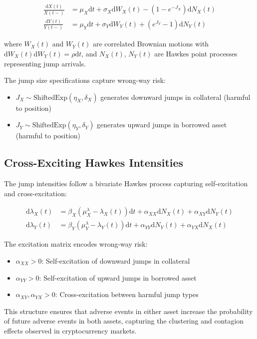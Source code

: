 \documentclass{article}
\newcommand{\diff}{\mathrm{d}}
\theoremstyle{definition}
\begin{document}
\begin{align}
\frac{\diff X(t)}{X(t-)} &= \mu_X \diff t + \sigma_X \diff W_X(t) - (1-e^{-J_X}) \diff N_X(t) \label{eq:X_dynamics}\\
\frac{\diff Y(t)}{Y(t-)} &= \mu_Y \diff t + \sigma_Y \diff W_Y(t) + (e^{J_Y}-1) \diff N_Y(t) \label{eq:Y_dynamics}
\end{align}

where $W_X(t)$ and $W_Y(t)$ are correlated Brownian motions with $\diff W_X(t) \diff W_Y(t) = \rho \diff t$, and $N_X(t)$, $N_Y(t)$ are Hawkes point processes representing jump arrivals.

The jump size specifications capture wrong-way risk:
\begin{itemize}
    \item $J_X \sim \text{ShiftedExp}(\eta_X, \delta_X)$ generates downward jumps in collateral (harmful to position)
    \item $J_Y \sim \text{ShiftedExp}(\eta_Y, \delta_Y)$ generates upward jumps in borrowed asset (harmful to position)
\end{itemize}

\subsection{Cross-Exciting Hawkes Intensities}

The jump intensities follow a bivariate Hawkes process capturing self-excitation and cross-excitation:

\begin{align}
\diff \lambda_X(t) &= \beta_X(\mu_X^\lambda - \lambda_X(t))\diff t + \alpha_{XX}\diff N_X(t) + \alpha_{XY}\diff N_Y(t) \label{eq:lambda_X}\\
\diff \lambda_Y(t) &= \beta_Y(\mu_Y^\lambda - \lambda_Y(t))\diff t + \alpha_{YY}\diff N_Y(t) + \alpha_{YX}\diff N_X(t) \label{eq:lambda_Y}
\end{align}

The excitation matrix encodes wrong-way risk:
\begin{itemize}
    \item $\alpha_{XX} > 0$: Self-excitation of downward jumps in collateral
    \item $\alpha_{YY} > 0$: Self-excitation of upward jumps in borrowed asset  
    \item $\alpha_{XY}, \alpha_{YX} > 0$: Cross-excitation between harmful jump types
\end{itemize}

This structure ensures that adverse events in either asset increase the probability of future adverse events in both assets, capturing the clustering and contagion effects observed in cryptocurrency markets.
\end{document}
